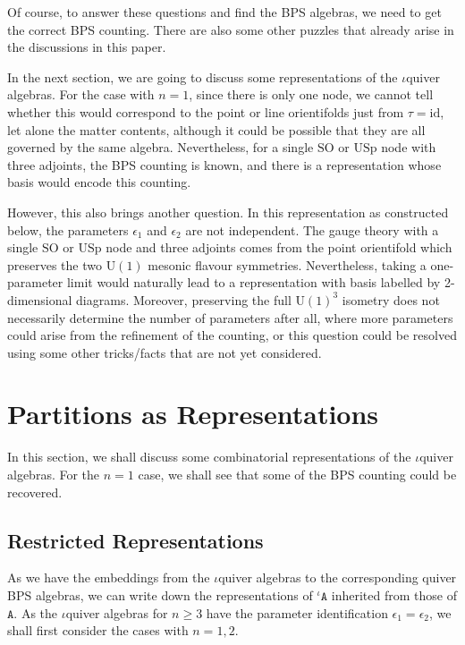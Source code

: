 \documentclass[11pt]{article}
\numberwithin{equation}{section}
\numberwithin{figure}{section}
\numberwithin{table}{section}
\newcommand{\U}{\mathrm{U}}
\newcommand{\SO}{\mathrm{SO}}
\newcommand{\USp}{\mathrm{USp}}
\begin{document}
Of course, to answer these questions and find the BPS algebras, we need to get the correct BPS counting. There are also some other puzzles that already arise in the discussions in this paper.

In the next section, we are going to discuss some representations of the $\iota$quiver algebras. For the case with $n=1$, since there is only one node, we cannot tell whether this would correspond to the point or line orientifolds just from $\tau=\mathrm{id}$, let alone the matter contents, although it could be possible that they are all governed by the same algebra. Nevertheless, for a single $\SO$ or $\USp$ node with three adjoints, the BPS counting is known, and there is a representation whose basis would encode this counting.

However, this also brings another question. In this representation as constructed below, the parameters $\epsilon_1$ and $\epsilon_2$ are not independent. The gauge theory with a single $\SO$ or $\USp$ node and three adjoints comes from the point orientifold which preserves the two $\U(1)$ mesonic flavour symmetries. Nevertheless, taking a one-parameter limit would naturally lead to a representation with basis labelled by 2-dimensional diagrams. Moreover, preserving the full $\U(1)^3$ isometry does not necessarily determine the number of parameters after all, where more parameters could arise from the refinement of the counting, or this question could be resolved using some other tricks/facts that are not yet considered.

\section{Partitions as Representations}\label{representations}
In this section, we shall discuss some combinatorial representations of the $\iota$quiver algebras. For the $n=1$ case, we shall see that some of the BPS counting could be recovered.

\subsection{Restricted Representations}\label{restrictedrepresentations}
As we have the embeddings from the $\iota$quiver algebras to the corresponding quiver BPS algebras, we can write down the representations of ${}^\iota\mathtt{A}$ inherited from those of $\mathtt{A}$. As the $\iota$quiver algebras for $n\geq3$ have the parameter identification $\epsilon_1=\epsilon_2$, we shall first consider the cases with $n=1,2$.
\end{document}
